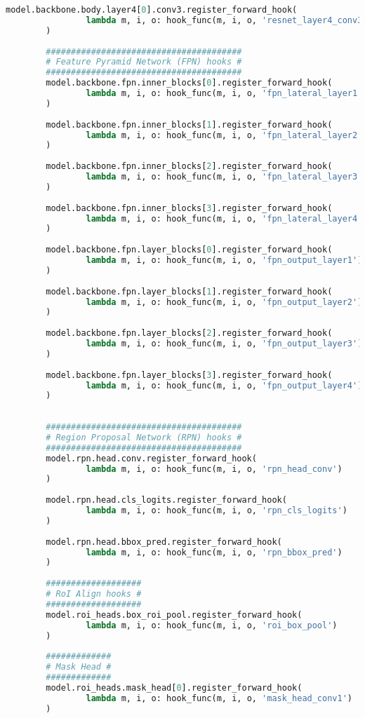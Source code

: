\begin{lstlisting}[language=Python,caption=Hooking insight informations from Mask R-CNN, label=lst:inference-insight]
		model.backbone.body.layer4[0].conv3.register_forward_hook(
				lambda m, i, o: hook_func(m, i, o, 'resnet_layer4_conv3')
		)
		
		#######################################
		# Feature Pyramid Network (FPN) hooks #
		#######################################
		model.backbone.fpn.inner_blocks[0].register_forward_hook(
				lambda m, i, o: hook_func(m, i, o, 'fpn_lateral_layer1')
		)
		
		model.backbone.fpn.inner_blocks[1].register_forward_hook(
				lambda m, i, o: hook_func(m, i, o, 'fpn_lateral_layer2')
		)
		
		model.backbone.fpn.inner_blocks[2].register_forward_hook(
				lambda m, i, o: hook_func(m, i, o, 'fpn_lateral_layer3')
		)
		
		model.backbone.fpn.inner_blocks[3].register_forward_hook(
				lambda m, i, o: hook_func(m, i, o, 'fpn_lateral_layer4')
		)
		
		model.backbone.fpn.layer_blocks[0].register_forward_hook(
				lambda m, i, o: hook_func(m, i, o, 'fpn_output_layer1')
		)
		
		model.backbone.fpn.layer_blocks[1].register_forward_hook(
				lambda m, i, o: hook_func(m, i, o, 'fpn_output_layer2')
		)
		
		model.backbone.fpn.layer_blocks[2].register_forward_hook(
				lambda m, i, o: hook_func(m, i, o, 'fpn_output_layer3')
		)
		
		model.backbone.fpn.layer_blocks[3].register_forward_hook(
				lambda m, i, o: hook_func(m, i, o, 'fpn_output_layer4')
		)
		
		
		#######################################
		# Region Proposal Network (RPN) hooks #
		#######################################
		model.rpn.head.conv.register_forward_hook(
				lambda m, i, o: hook_func(m, i, o, 'rpn_head_conv')
		)
		
		model.rpn.head.cls_logits.register_forward_hook(
				lambda m, i, o: hook_func(m, i, o, 'rpn_cls_logits')
		)
		
		model.rpn.head.bbox_pred.register_forward_hook(
				lambda m, i, o: hook_func(m, i, o, 'rpn_bbox_pred')
		)
		
		###################
		# RoI Align hooks #
		###################
		model.roi_heads.box_roi_pool.register_forward_hook(
				lambda m, i, o: hook_func(m, i, o, 'roi_box_pool')
		)
		
		#############
		# Mask Head #
		#############
		model.roi_heads.mask_head[0].register_forward_hook(
				lambda m, i, o: hook_func(m, i, o, 'mask_head_conv1')
		)
		

\end{lstlisting}
